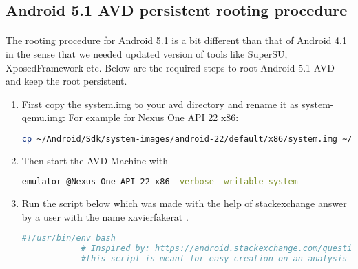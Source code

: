 \documentclass[../main.tex]{subfile}
\begin{document}
		\subsection{Android 5.1 AVD persistent rooting procedure} \label{sec:android_5.1_root}
		\paragraph{} The rooting procedure for Android 5.1 is a bit different than that of Android 4.1 in the sense that we needed updated version of tools like SuperSU, XposedFramework etc. Below are the required steps to root Android 5.1 AVD and keep the root persistent.
		\begin{enumerate}
			\item First copy the system.img to your avd directory and rename it as system-qemu.img: For example for Nexus One API 22 x86: \newline 
			\begin{lstlisting}[language=bash]
			cp ~/Android/Sdk/system-images/android-22/default/x86/system.img ~/.android/avd/Nexus_One_API_22_x86.avd/system-qemu.img
			\end{lstlisting}
						
			
			\item Then start the AVD Machine with \newline 
			\begin{lstlisting}[language=bash]
			emulator @Nexus_One_API_22_x86 -verbose -writable-system
			\end{lstlisting}
						
			
			\item Run the script below which was made with the help of stackexchange answer by a user with the name xavier\textunderscore fakerat \cite{android_emulator_7.1_root_stackexchange}.
			\begin{lstlisting}[language=bash]
			#!/usr/bin/env bash
			# Inspired by: https://android.stackexchange.com/questions/171442/root-android-virtual-device-with-android-7-1-1/176447
			#this script is meant for easy creation on an analysis machine for android emulator avd
			

\end{lstlisting}
\end{enumerate}
\end{document}
